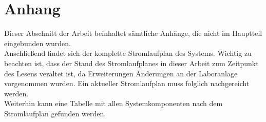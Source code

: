 \documentclass[../Bachelorarbeit.tex]{subfiles}
\begin{document}
\section*{Anhang} \label{anhang}
Dieser Abschnitt der Arbeit beinhaltet sämtliche Anhänge, die nicht im Hauptteil eingebunden wurden.\\
Anschließend findet sich der komplette Stromlaufplan des Systems. Wichtig zu beachten ist, dass der Stand des Stromlaufplanes in dieser Arbeit zum Zeitpunkt des Lesens veraltet ist, da Erweiterungen \bzw Änderungen an der Laboranlage vorgenommen wurden. Ein aktueller Stromlaufplan muss folglich nachgereicht werden.\\ Weiterhin kann eine Tabelle mit allen Systemkomponenten nach dem Stromlaufplan gefunden werden.














\end{document}
